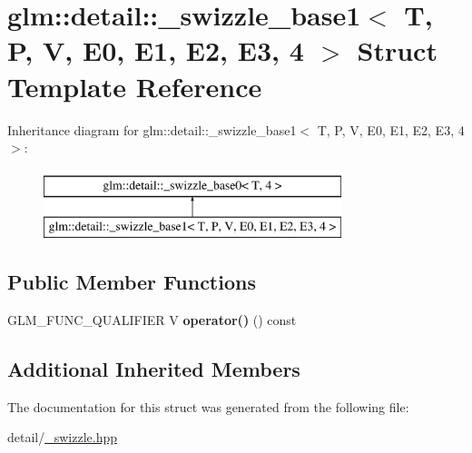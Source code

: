 \hypertarget{structglm_1_1detail_1_1__swizzle__base1_3_01T_00_01P_00_01V_00_01E0_00_01E1_00_01E2_00_01E3_00_014_01_4}{\section{glm\-:\-:detail\-:\-:\-\_\-swizzle\-\_\-base1$<$ T, P, V, E0, E1, E2, E3, 4 $>$ Struct Template Reference}
\label{structglm_1_1detail_1_1__swizzle__base1_3_01T_00_01P_00_01V_00_01E0_00_01E1_00_01E2_00_01E3_00_014_01_4}
}
Inheritance diagram for glm\-:\-:detail\-:\-:\-\_\-swizzle\-\_\-base1$<$ T, P, V, E0, E1, E2, E3, 4 $>$\-:\begin{figure}[H]
\begin{center}
\leavevmode
\includegraphics[height=2.000000cm]{structglm_1_1detail_1_1__swizzle__base1_3_01T_00_01P_00_01V_00_01E0_00_01E1_00_01E2_00_01E3_00_014_01_4}
\end{center}
\end{figure}
\subsection*{Public Member Functions}
\begin{DoxyCompactItemize}
\item 
\hypertarget{structglm_1_1detail_1_1__swizzle__base1_3_01T_00_01P_00_01V_00_01E0_00_01E1_00_01E2_00_01E3_00_014_01_4_a901f3af50b0eb022c3246b5de5027245}{G\-L\-M\-\_\-\-F\-U\-N\-C\-\_\-\-Q\-U\-A\-L\-I\-F\-I\-E\-R V {\bfseries operator()} () const }\label{structglm_1_1detail_1_1__swizzle__base1_3_01T_00_01P_00_01V_00_01E0_00_01E1_00_01E2_00_01E3_00_014_01_4_a901f3af50b0eb022c3246b5de5027245}

\end{DoxyCompactItemize}
\subsection*{Additional Inherited Members}


The documentation for this struct was generated from the following file\-:\begin{DoxyCompactItemize}
\item 
detail/\hyperlink{__swizzle_8hpp}{\-\_\-swizzle.\-hpp}\end{DoxyCompactItemize}
